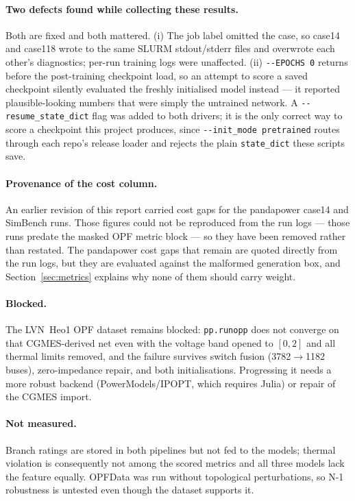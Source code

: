 \documentclass[10pt]{article}
\begin{document}
\paragraph{Two defects found while collecting these results.} Both are fixed and
both mattered. (i) The job label omitted the case, so case14 and case118 wrote
to the same SLURM stdout/stderr files and overwrote each other's diagnostics;
per-run training logs were unaffected. (ii) \texttt{-{}-EPOCHS 0} returns before
the post-training checkpoint load, so an attempt to score a saved checkpoint
silently evaluated the freshly initialised model instead --- it reported
plausible-looking numbers that were simply the untrained network. A
\texttt{-{}-resume\_state\_dict} flag was added to both drivers; it is the only
correct way to score a checkpoint this project produces, since
\texttt{-{}-init\_mode pretrained} routes through each repo's release loader and
rejects the plain \texttt{state\_dict} these scripts save.

\paragraph{Provenance of the cost column.} An earlier revision of this report
carried cost gaps for the pandapower case14 and SimBench runs. Those figures
could not be reproduced from the run logs --- those runs predate the masked OPF
metric block --- so they have been removed rather than restated. The pandapower
cost gaps that remain are quoted directly from the run logs, but they are
evaluated against the malformed generation box, and
Section~\ref{sec:metrics} explains why none of them should carry weight.

\paragraph{Blocked.} The LVN~Heo1 OPF dataset remains blocked:
\texttt{pp.runopp} does not converge on that CGMES-derived net even with the
voltage band opened to \([0,2]\) and all thermal limits removed, and the failure
survives switch fusion (3782\(\rightarrow\)1182 buses), zero-impedance repair,
and both initialisations. Progressing it needs a more robust backend
(PowerModels/IPOPT, which requires Julia) or repair of the CGMES import.

\paragraph{Not measured.} Branch ratings are stored in both pipelines but not fed
to the models; thermal violation is consequently not among the scored metrics and
all three models lack the feature equally. OPFData was run without topological
perturbations, so N-1 robustness is untested even though the dataset supports it.
\end{document}
